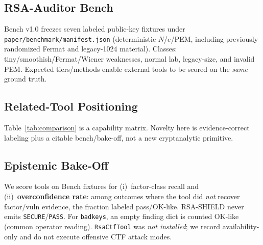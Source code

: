 \documentclass[conference]{IEEEtran}
\begin{document}
\subsection{RSA-Auditor Bench}
Bench v1.0 freezes seven labeled public-key fixtures under \texttt{paper/benchmark/manifest.json} (deterministic $N$/$e$/PEM, including previously randomized Fermat and legacy-1024 material). Classes: tiny/smoothish/Fermat/Wiener weaknesses, normal lab, legacy-size, and invalid PEM. Expected tiers/methods enable external tools to be scored on the \emph{same} ground truth.

\subsection{Related-Tool Positioning}
Table~\ref{tab:comparison} is a capability matrix. Novelty here is evidence-correct labeling plus a citable bench/bake-off, not a new cryptanalytic primitive.

\begin{table}[t]
\caption{Positioning versus representative tools (capability matrix).}
\label{tab:comparison}
\centering
{}
\end{table}

\subsection{Epistemic Bake-Off}
\label{sec:bakeoff}
We score tools on Bench fixtures for (i)~factor-class recall and (ii)~\textbf{overconfidence rate}: among outcomes where the tool did \emph{not} recover factor/vuln evidence, the fraction labeled pass/OK-like. RSA-SHIELD never emits \texttt{SECURE}/\texttt{PASS}. For \texttt{badkeys}, an empty finding dict is counted OK-like (common operator reading). \texttt{RsaCtfTool} was \emph{not installed}; we record availability-only and do not execute offensive CTF attack modes.
\end{document}
